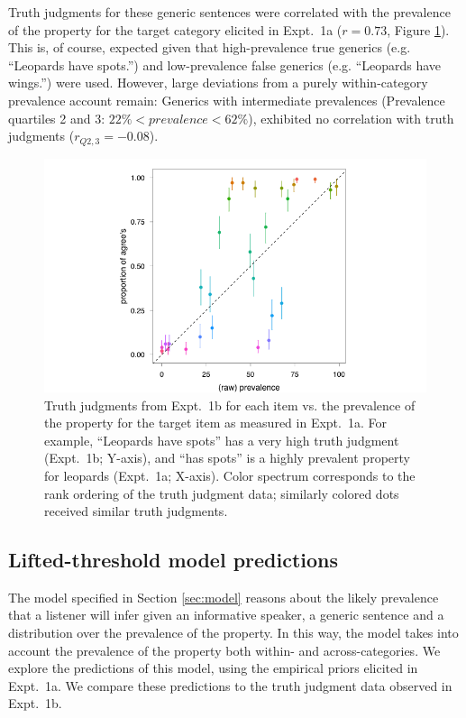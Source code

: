 \documentclass[10pt,letterpaper]{article}
\begin{document}
Truth judgments for these generic sentences were correlated with the prevalence of the property for the target category elicited in Expt.~1a ($r = 0.73$, Figure \ref{fig:scatterprev}). This is, of course, expected given that high-prevalence true generics (e.g. ``Leopards have spots.'') and low-prevalence false generics (e.g. ``Leopards have wings.'') were used. 
However, large deviations from a purely within-category prevalence account remain: Generics with intermediate prevalences (Prevalence quartiles 2 and 3: $ 22\% < prevalence < 62\%$), exhibited no correlation with truth judgments ($r_{Q2,3} = -0.08$).


\begin{figure}
\centering
    \includegraphics[width=0.8\columnwidth]{tj_n50_tjVsPrevalence}
    \caption{Truth judgments from Expt.~1b for each item vs. the prevalence of the property for the target item as measured in Expt.~1a. For example, ``Leopards have spots'' has a very high truth judgment (Expt.~1b; Y-axis), and ``has spots'' is a highly prevalent property for leopards (Expt.~1a; X-axis). Color spectrum corresponds to the rank ordering of the truth judgment data; similarly colored dots received similar truth judgments.}
  \label{fig:scatterprev}
\end{figure}




\subsection{Lifted-threshold model predictions}

The model specified in Section \ref{sec:model} reasons about the likely prevalence that a listener will infer given an informative speaker, a generic sentence and a distribution over the prevalence of the property. 
In this way, the model takes into account the prevalence of the property both within- and across-categories.
We explore the predictions of this model, using the empirical priors elicited in Expt.~1a. 
We compare these predictions to the truth judgment data observed in Expt.~1b.
\end{document}
